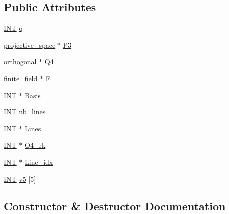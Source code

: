 \subsection*{Public Attributes}
\begin{DoxyCompactItemize}
\item 
\mbox{\hyperlink{galois_8h_a09fddde158a3a20bd2dcadb609de11dc}{I\+NT}} \mbox{\hyperlink{class_w3q_a776faf2ab49c48556d6f3be9e22e9579}{q}}
\item 
\mbox{\hyperlink{classprojective__space}{projective\+\_\+space}} $\ast$ \mbox{\hyperlink{class_w3q_ae33352a370c2aa0b27d215fe0796cc95}{P3}}
\item 
\mbox{\hyperlink{classorthogonal}{orthogonal}} $\ast$ \mbox{\hyperlink{class_w3q_ab09a67790be11093f04f51d99869eb73}{Q4}}
\item 
\mbox{\hyperlink{classfinite__field}{finite\+\_\+field}} $\ast$ \mbox{\hyperlink{class_w3q_a3989d8ebb5363eae87a4710bbdee3595}{F}}
\item 
\mbox{\hyperlink{galois_8h_a09fddde158a3a20bd2dcadb609de11dc}{I\+NT}} $\ast$ \mbox{\hyperlink{class_w3q_ab87f235d813a44c4f15732da74d6e70f}{Basis}}
\item 
\mbox{\hyperlink{galois_8h_a09fddde158a3a20bd2dcadb609de11dc}{I\+NT}} \mbox{\hyperlink{class_w3q_aaf61a5928b3873bc9090a360c6e99a81}{nb\+\_\+lines}}
\item 
\mbox{\hyperlink{galois_8h_a09fddde158a3a20bd2dcadb609de11dc}{I\+NT}} $\ast$ \mbox{\hyperlink{class_w3q_a9d4e3ceae81ab3142c30b23a64b82824}{Lines}}
\item 
\mbox{\hyperlink{galois_8h_a09fddde158a3a20bd2dcadb609de11dc}{I\+NT}} $\ast$ \mbox{\hyperlink{class_w3q_a31138a0a1d0d691136d18ac58ea1e0ee}{Q4\+\_\+rk}}
\item 
\mbox{\hyperlink{galois_8h_a09fddde158a3a20bd2dcadb609de11dc}{I\+NT}} $\ast$ \mbox{\hyperlink{class_w3q_afec587b227c37c399b316d51b8772092}{Line\+\_\+idx}}
\item 
\mbox{\hyperlink{galois_8h_a09fddde158a3a20bd2dcadb609de11dc}{I\+NT}} \mbox{\hyperlink{class_w3q_a77a4101e40ff9a9c1a73eb1d6bcbc9fc}{v5}} \mbox{[}5\mbox{]}
\end{DoxyCompactItemize}


\subsection{Constructor \& Destructor Documentation}
\mbox{\label{class_w3q_a768356f42fe34c262de0e25c32674aba}} 
